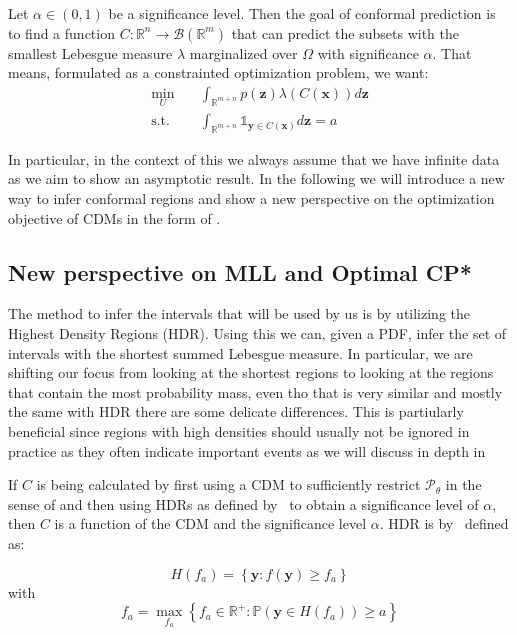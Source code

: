 Let $\alpha \in (0,1)$ be a significance level. Then the goal of conformal prediction is to find a function $C : \mathbb{R}^n \to \mathcal{B}(\mathbb{R}^m)$ that can predict the subsets with the smallest Lebesgue measure $\lambda$ marginalized over $\Omega$ with significance $\alpha$. That means, formulated as a constrainted optimization problem, we want:
\begin{align}
    \min_U \quad      & \int_{\mathbb{R}^{m + n}} p(\mathbf{z})
    \lambda(C(\mathbf{x}))
    d\mathbf{z}
    \\
    \text{s.t.} \quad & \int_{\mathbb{R}^{m + n}} \mathds{1}_{\mathbf{y} \in
    C(\mathbf{x})} d\mathbf{z} = a
\end{align}

In particular, in the context of this  we always assume that we have infinite data as we aim to show an asymptotic result. In the following  we will introduce a new way to infer conformal regions and show a new perspective on the optimization objective of CDMs in the form of .

\subsection{New perspective on MLL and Optimal CP*}\label{sec:optimal_cp_proofs}

The method to infer the intervals that will be used by us is by utilizing the Highest Density Regions (HDR). Using this we can, given a PDF, infer the set of intervals with the shortest summed Lebesgue measure. In particular, we are shifting our focus from looking at the shortest regions to looking at the regions that contain the most probability mass, even tho that is very similar and mostly the same with HDR there are some delicate differences. This is partiularly beneficial since regions with high densities should usually not be ignored in practice as they often indicate important events as we will discuss in depth in 

If $C$ is being calculated by first using a CDM to sufficiently restrict $\mathscr{P}_\theta$ in the sense of  and then using HDRs as defined by~\cite{hyndman1996computing} to obtain a significance level of $\alpha$, then $C$ is a function of the CDM and the significance level $\alpha$. HDR is by~\cite{hyndman1996computing} defined as:

\[
    H\left(f_a\right)=\left\{\mathbf{y}: f(\mathbf{y}) \geq f_a\right\}
\]
with
\[
    f_a = \max_{f_a} \left\{f_a \in \mathbb{R^+}: \mathbb{P}\left(\mathbf{y}
    \in
    H(f_a)\right) \geq a \right\}
\]

